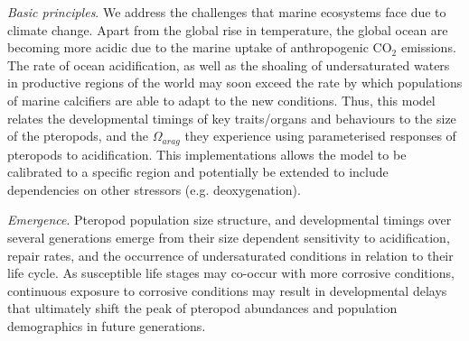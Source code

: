 \textit{Basic principles}.  We address the challenges that marine ecosystems face due to climate change. Apart from the global rise in temperature, the global ocean are becoming more acidic due to the marine uptake of anthropogenic CO$_2$ emissions. The rate of ocean acidification, as well as the shoaling of undersaturated waters in productive regions of the world may soon exceed the rate by which populations of marine calcifiers are able to adapt to the new conditions. Thus, this model relates the developmental timings of key traits/organs and behaviours to the size of the pteropods, and the $\Omega_{arag}$ they experience using parameterised responses of pteropods to acidification. This implementations allows the model to be calibrated to a specific region and potentially be extended to include dependencies on other stressors (e.g. deoxygenation).






\textit{Emergence}. Pteropod population size structure, and developmental timings over several generations emerge from their size dependent sensitivity to acidification, repair rates, and the occurrence of undersaturated conditions in relation to their life cycle. As susceptible life stages may co-occur with more corrosive conditions, continuous exposure to corrosive conditions may result in developmental delays that ultimately shift the peak of pteropod abundances and population demographics in future generations. %

